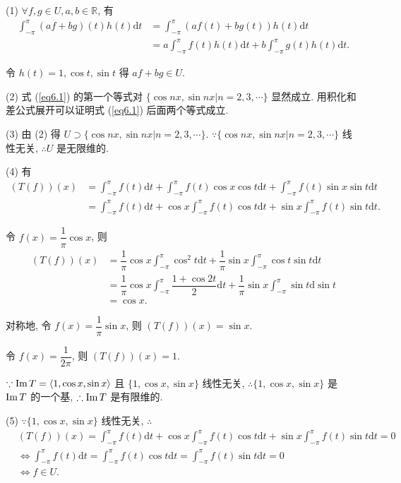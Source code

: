 \documentclass[color=black,device=normal,lang=cn,mode=geye]{elegantnote}
\begin{document}
\begin{solution}
    (1) $\forall f,g\in U,a,b\in\mathbb{R}$, 有
    \begin{align*}
        \int_{-\pi}^{\pi}(af+bg)(t)h(t)\mathrm{d}t & =\int_{-\pi}^{\pi}(af(t)+bg(t))h(t)\mathrm{d}t \\
        & =a\int_{-\pi}^{\pi}f(t)h(t)\mathrm{d}t+b\int_{-\pi}^{\pi}g(t)h(t)\mathrm{d}t.
    \end{align*}

    令 $h(t)=1,\cos t,\sin t$ 得 $af+bg\in U$.

    (2) 式 (\ref{eq6.1}) 的第一个等式对 $\{\cos nx,\sin nx|n=2,3,\cdots\}$ 显然成立. 用积化和差公式展开可以证明式 (\ref{eq6.1}) 后面两个等式成立.

    (3) 由 (2) 得 $U\supset\{\cos nx,\sin nx|n=2,3,\cdots\}$. $\because\{\cos nx,\sin nx|n=2,3,\cdots\}$ 线性无关, $\therefore U$ 是无限维的.

    (4) 有
    \begin{align*}
        (T(f))(x) & =\int_{-\pi}^{\pi}f(t)\mathrm{d}t+\int_{-\pi}^{\pi}f(t)\cos x\cos t\mathrm{d}t+\int_{-\pi}^{\pi}f(t)\sin x\sin t\mathrm{d}t \\
        & =\int_{-\pi}^{\pi}f(t)\mathrm{d}t+\cos x\int_{-\pi}^{\pi}f(t)\cos t\mathrm{d}t+\sin x\int_{-\pi}^{\pi}f(t)\sin t\mathrm{d}t.
    \end{align*}

    令 $f(x)=\dfrac{1}{\pi}\cos x$, 则
    \begin{align*}
        (T(f))(x) & =\dfrac{1}{\pi}\cos x\int_{-\pi}^{\pi}\cos^2t\mathrm{d}t+\dfrac{1}{\pi}\sin x\int_{-\pi}^{\pi}\cos t\sin t\mathrm{d}t \\
        & =\dfrac{1}{\pi}\cos x\int_{-\pi}^{\pi}\dfrac{1+\cos2t}{2}\mathrm{d}t+\dfrac{1}{\pi}\sin x\int_{-\pi}^{\pi}\sin t\mathrm{d}\sin t \\
        & =\cos x.
    \end{align*}

    对称地, 令 $f(x)=\dfrac{1}{\pi}\sin x$, 则 $(T(f))(x)=\sin x$.

    令 $f(x)=\dfrac{1}{2\pi}$, 则 $(T(f))(x)=1$.

    $\because\operatorname{Im} T=\left<1,\cos x,\sin x\right>$ 且 $\{1,\cos x,\sin x\}$ 线性无关, $\therefore\{1,\cos x,\sin x\}$ 是 $\operatorname{Im} T$ 的一个基, $\therefore\operatorname{Im} T$ 是有限维的.

    (5) $\because\{1,\cos x,\sin x\}$ 线性无关, $\therefore$
    \begin{align*}
        & (T(f))(x)=\int_{-\pi}^{\pi}f(t)\mathrm{d}t+\cos x\int_{-\pi}^{\pi}f(t)\cos t\mathrm{d}t+\sin x\int_{-\pi}^{\pi}f(t)\sin t\mathrm{d}t=0 \\
        & \Leftrightarrow\int_{-\pi}^{\pi}f(t)\mathrm{d}t=\int_{-\pi}^{\pi}f(t)\cos t\mathrm{d}t=\int_{-\pi}^{\pi}f(t)\sin t\mathrm{d}t=0 \\
        & \Leftrightarrow f\in U.
    \end{align*}


\end{solution}
\end{document}
